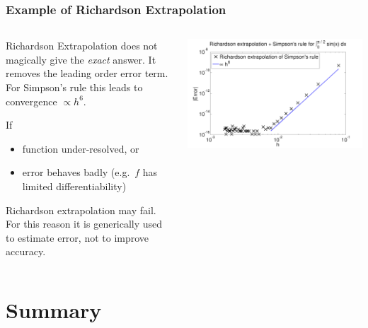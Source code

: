 \documentclass{beamer}
\begin{document}
\begin{frame}
  \frametitle{Example of Richardson Extrapolation}

  \begin{columns}
    \begin{column}{0.475\textwidth}
      Richardson Extrapolation does not magically give the
      \emph{exact} answer. It removes the leading order error
      term. For Simpson's rule this leads to convergence $\propto
      h^6$. \pause

      \vspace{1ex}

      If
      \begin{itemize}
      \item function under-resolved, or
      \item error behaves badly (e.g.\ $f$ has limited
        differentiability)
      \end{itemize}
      Richardson extrapolation may fail. For this reason it is
      generically used to estimate error, not to improve accuracy.
    \end{column}
    \begin{column}{0.525\textwidth}
      \begin{center}
        \includegraphics[width=\textwidth]{figures/Richardson1}
      \end{center}
    \end{column}
  \end{columns}

\end{frame}

\section{Summary}
\end{document}

